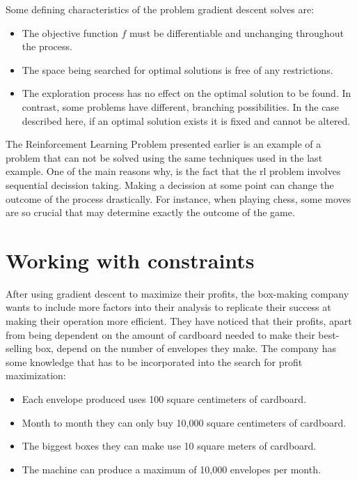 Some defining characteristics of the problem gradient descent solves are:
\begin{itemize}
    \item The objective function $f$ must be differentiable and unchanging
        throughout the process.
    \item The space being searched for optimal solutions is free of any
        restrictions.
    \item The exploration process has no effect on the optimal solution to be
        found. In contrast, some problems have different, branching possibilities.
        In the case described here, if an optimal solution exists it is fixed and
        cannot be altered.
\end{itemize}
The Reinforcement Learning Problem presented earlier is an example of a problem
that can not be solved using the same techniques used in the last example. One
of the main reasons why, is the fact that the \ac{rl} problem involves sequential
decission taking. Making a decission at some point can change the outcome of the
process drastically. For instance, when playing chess, some moves are so crucial
that may determine exactly the outcome of the game.

\section{Working with constraints}

After using gradient descent to maximize their profits, the box-making company
wants to include more factors into their analysis to replicate their success at
making their operation more efficient. They have noticed that their profits,
apart from being dependent on the amount of cardboard needed to make their
best-selling box, depend on the number of envelopes they make. The company has
some knowledge that has to be incorporated into the search for profit
maximization:
\begin{itemize}
    \item Each envelope produced uses 100 square centimeters of cardboard.
    \item Month to month they can only buy 10,000 square centimeters of cardboard.
    \item The biggest boxes they can make use 10 square meters of cardboard.
    \item The machine can produce a maximum of 10,000 envelopes per month.
\end{itemize}


